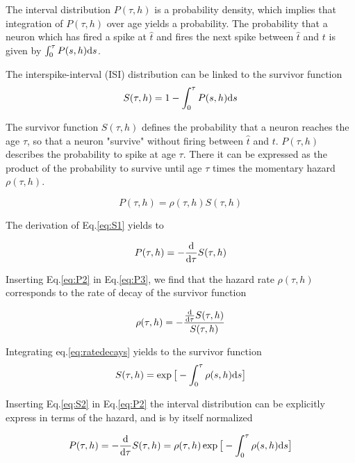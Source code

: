 \documentclass[12pt,twoside]{report}
\def \dd  {{\rm d}}
\begin{document}
The interval distribution $P(\tau,h)$ is a probability density, which implies that integration of $P(\tau,h)$ over age yields a probability. The probability that a neuron which has fired a spike at $\hat{t}$ and fires the next spike between $\hat{t}$ and $t$ is given by $\int_0^\tau P(s,h) \dd s$.

The interspike-interval (ISI) distribution can be linked to the survivor function
\begin{equation}
\label{eq:S1}
S(\tau,h)=1-\int_0^\tau P(s,h) \dd s
\end{equation}

The survivor function $S(\tau,h)$ defines the probability that a neuron reaches the age $\tau$, so that a neuron "survive" without firing between $\hat{t}$ and $t$. $P(\tau,h)$ describes the probability to spike at age $\tau$. There it can be expressed as the product of the probability to survive until age $\tau$ times the momentary hazard $\rho(\tau,h)$. 

\begin{equation}
\label{eq:P2}
P(\tau,h)=\rho(\tau,h)S(\tau,h)
\end{equation}

The derivation of Eq.\eqref{eq:S1} yields to 

\begin{equation}
\label{eq:P3}
P(\tau,h)=-\frac{\dd}{\dd \tau}S(\tau,h)
\end{equation}

Inserting Eq.\eqref{eq:P2} in Eq.\eqref{eq:P3}, we find that the hazard rate $\rho(\tau,h)$ corresponds to the rate of decay of the survivor function

\begin{equation}
\label{eq:ratedecays}
\rho(\tau,h)=-\frac{\frac{\dd}{\dd \tau}S(\tau,h)}{S(\tau,h)}
\end{equation}

Integrating eq.\ref{eq:ratedecays} yields to the survivor function
\begin{equation}
\label{eq:S2}
S(\tau,h)=\exp\big[-\int_0^\tau\rho(s,h)\dd s\big]
\end{equation}

Inserting Eq.\eqref{eq:S2} in Eq.\eqref{eq:P2} the interval distribution can be explicitly express in terms of the hazard, and is by itself normalized

\begin{equation}
\label{eq:P4}
P(\tau,h)=-\frac{\dd}{\dd \tau}S(\tau,h)=\rho(\tau,h)\exp\big[-\int_0^\tau\rho(s,h)\dd s\big]
\end{equation}
\end{document}
